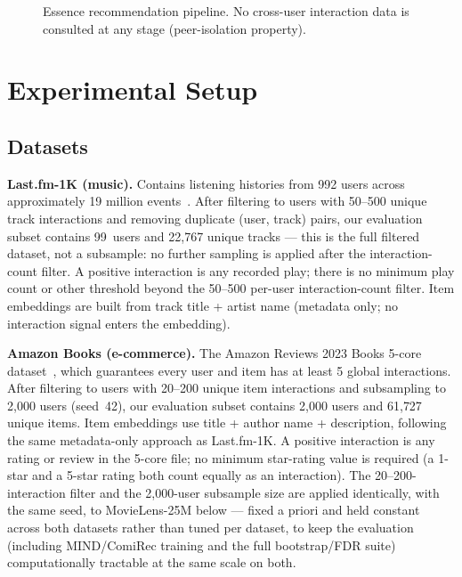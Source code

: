 \documentclass[11pt,a4paper]{article}
\begin{document}
\begin{figure}[H]
\caption{Essence recommendation pipeline. No cross-user interaction data is consulted at
any stage (peer-isolation property).}
\label{fig:pipeline}
\end{figure}

\section{Experimental Setup}
\label{sec:setup}

\subsection{Datasets}

\textbf{Last.fm-1K (music).} Contains listening histories from 992 users
across approximately 19 million events~\cite{celma2010}. After filtering to
users with 50--500 unique track interactions and removing duplicate
(user, track) pairs, our evaluation subset contains 99~users and 22{,}767
unique tracks --- this is the full filtered dataset, not a subsample: no
further sampling is applied after the interaction-count filter. A positive
interaction is any recorded play; there is no minimum play count or other
threshold beyond the 50--500 per-user interaction-count filter. Item
embeddings are built from track title + artist name (metadata only; no
interaction signal enters the embedding).

\textbf{Amazon Books (e-commerce).} The Amazon Reviews 2023 Books 5-core
dataset~\cite{hou2024}, which guarantees every user and item has at least
5 global interactions. After filtering to users with 20--200 unique item
interactions and subsampling to 2{,}000 users (seed~42), our evaluation
subset contains 2{,}000 users and 61{,}727 unique items. Item embeddings use
title + author name + description, following the same metadata-only
approach as Last.fm-1K. A positive interaction is any rating or review in
the 5-core file; no minimum star-rating value is required (a 1-star and a
5-star rating both count equally as an interaction). The 20--200-interaction filter and the 2{,}000-user
subsample size are applied identically, with the same seed, to MovieLens-25M
below --- fixed a priori and held constant across both datasets rather than
tuned per dataset, to keep the evaluation (including MIND/ComiRec training
and the full bootstrap/FDR suite) computationally tractable at the same
scale on both.
\end{document}
